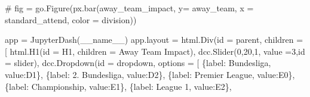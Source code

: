 \documentclass[
  letterpaper,
  DIV=11,
  numbers=noendperiod]{scrartcl}
\newenvironment{Shaded}{\begin{snugshade}}{\end{snugshade}}
\newcommand{\BuiltInTok}[1]{\textcolor[rgb]{0.00,0.23,0.31}{#1}}
\newcommand{\CommentTok}[1]{\textcolor[rgb]{0.37,0.37,0.37}{#1}}
\newcommand{\DecValTok}[1]{\textcolor[rgb]{0.68,0.00,0.00}{#1}}
\newcommand{\NormalTok}[1]{\textcolor[rgb]{0.00,0.23,0.31}{#1}}
\newcommand{\OperatorTok}[1]{\textcolor[rgb]{0.37,0.37,0.37}{#1}}
\newcommand{\StringTok}[1]{\textcolor[rgb]{0.13,0.47,0.30}{#1}}
\newcommand{\VariableTok}[1]{\textcolor[rgb]{0.07,0.07,0.07}{#1}}
\begin{document}
\begin{Shaded}
\begin{Highlighting}[]
\CommentTok{\# fig = go.Figure(px.bar(away\_team\_impact, y= \textquotesingle{}away\_team\textquotesingle{}, x = \textquotesingle{}standard\_attend\textquotesingle{}, color = \textquotesingle{}division\textquotesingle{}))}

\NormalTok{app }\OperatorTok{=}\NormalTok{ JupyterDash(}\VariableTok{\_\_name\_\_}\NormalTok{)}
\NormalTok{app.layout }\OperatorTok{=}\NormalTok{ html.Div(}\BuiltInTok{id} \OperatorTok{=} \StringTok{\textquotesingle{}parent\textquotesingle{}}\NormalTok{, children }\OperatorTok{=}\NormalTok{ [}
\NormalTok{    html.H1(}\BuiltInTok{id} \OperatorTok{=} \StringTok{\textquotesingle{}H1\textquotesingle{}}\NormalTok{, children }\OperatorTok{=} \StringTok{\textquotesingle{}Away Team Impact\textquotesingle{}}\NormalTok{),}
\NormalTok{    dcc.Slider(}\DecValTok{0}\NormalTok{,}\DecValTok{20}\NormalTok{,}\DecValTok{1}\NormalTok{, value }\OperatorTok{=}\DecValTok{3}\NormalTok{,}\BuiltInTok{id} \OperatorTok{=} \StringTok{\textquotesingle{}slider\textquotesingle{}}\NormalTok{),}
\NormalTok{    dcc.Dropdown(}\BuiltInTok{id} \OperatorTok{=} \StringTok{\textquotesingle{}dropdown\textquotesingle{}}\NormalTok{, }
\NormalTok{                 options }\OperatorTok{=}\NormalTok{ [}
\NormalTok{                \{}\StringTok{\textquotesingle{}label\textquotesingle{}}\NormalTok{: }\StringTok{\textquotesingle{}Bundesliga\textquotesingle{}}\NormalTok{, }\StringTok{\textquotesingle{}value\textquotesingle{}}\NormalTok{:}\StringTok{\textquotesingle{}D1\textquotesingle{}}\NormalTok{\},}
\NormalTok{                \{}\StringTok{\textquotesingle{}label\textquotesingle{}}\NormalTok{: }\StringTok{\textquotesingle{}2. Bundesliga\textquotesingle{}}\NormalTok{, }\StringTok{\textquotesingle{}value\textquotesingle{}}\NormalTok{:}\StringTok{\textquotesingle{}D2\textquotesingle{}}\NormalTok{\},}
\NormalTok{                \{}\StringTok{\textquotesingle{}label\textquotesingle{}}\NormalTok{: }\StringTok{\textquotesingle{}Premier League\textquotesingle{}}\NormalTok{, }\StringTok{\textquotesingle{}value\textquotesingle{}}\NormalTok{:}\StringTok{\textquotesingle{}E0\textquotesingle{}}\NormalTok{\},}
\NormalTok{                \{}\StringTok{\textquotesingle{}label\textquotesingle{}}\NormalTok{: }\StringTok{\textquotesingle{}Championship\textquotesingle{}}\NormalTok{, }\StringTok{\textquotesingle{}value\textquotesingle{}}\NormalTok{:}\StringTok{\textquotesingle{}E1\textquotesingle{}}\NormalTok{\},}
\NormalTok{                \{}\StringTok{\textquotesingle{}label\textquotesingle{}}\NormalTok{: }\StringTok{\textquotesingle{}League 1\textquotesingle{}}\NormalTok{, }\StringTok{\textquotesingle{}value\textquotesingle{}}\NormalTok{:}\StringTok{\textquotesingle{}E2\textquotesingle{}}\NormalTok{\},}

\end{Highlighting}
\end{Shaded}
\end{document}
